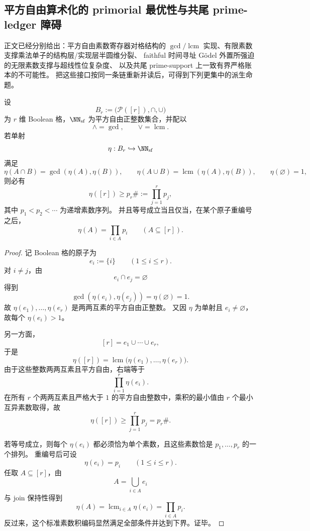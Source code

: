 \subsection{平方自由算术化的 primorial 最优性与共尾 prime-ledger 障碍}

正文已经分别给出：平方自由素数寄存器对格结构的
\(\gcd/\operatorname{lcm}\) 实现、有限素数支撑乘法单子的结构层/实现层半圆维分裂、
faithful 时间寻址 Gödel 外置所强迫的无限素数支撑与超线性位复杂度、
以及共尾 prime-support 上一致有界严格账本的不可能性。
把这些接口按同一条链重新并读后，可得到下列更集中的派生命题。

\begin{theorem}\label{thm:derived-boolean-squarefree-primorial-optimum}
设
\[
B_r:=\bigl(\mathcal P([r]),\cap,\cup\bigr)
\]
为 \(r\) 维 Boolean 格，\(\NN_{\mathrm{sf}}\) 为平方自由正整数集合，并配以
\[
\wedge=\gcd,
\qquad
\vee=\operatorname{lcm}.
\]
若单射
\[
\eta:B_r\hookrightarrow \NN_{\mathrm{sf}}
\]
满足
\[
\eta(A\cap B)=\gcd(\eta(A),\eta(B)),
\qquad
\eta(A\cup B)=\operatorname{lcm}(\eta(A),\eta(B)),
\qquad
\eta(\varnothing)=1,
\]
则必有
\[
\boxed{\;
\eta([r])\ge p_r\#:=\prod_{j=1}^{r}p_j,\;}
\]
其中 \(p_1<p_2<\cdots\) 为递增素数序列。
并且等号成立当且仅当，在某个原子重编号之后，
\[
\boxed{\;
\eta(A)=\prod_{i\in A}p_i
\qquad (A\subseteq [r]).\;}
\]
\end{theorem}

\begin{proof}
记 Boolean 格的原子为
\[
e_i:=\{i\}
\qquad (1\le i\le r).
\]
对 \(i\neq j\)，由
\[
e_i\cap e_j=\varnothing
\]
得到
\[
\gcd(\eta(e_i),\eta(e_j))
=
\eta(\varnothing)
=1.
\]
故 \(\eta(e_1),\dots,\eta(e_r)\) 是两两互素的平方自由正整数。
又因 \(\eta\) 为单射且 \(e_i\neq \varnothing\)，故每个 \(\eta(e_i)>1\)。

另一方面，
\[
[r]=e_1\cup\cdots\cup e_r,
\]
于是
\[
\eta([r])
=
\operatorname{lcm}\bigl(\eta(e_1),\dots,\eta(e_r)\bigr).
\]
由于这些整数两两互素且平方自由，右端等于
\[
\prod_{i=1}^{r}\eta(e_i).
\]
在所有 \(r\) 个两两互素且严格大于 \(1\) 的平方自由整数中，乘积的最小值由 \(r\) 个最小互异素数取得，故
\[
\eta([r])\ge \prod_{j=1}^{r}p_j=p_r\#.
\]

若等号成立，则每个 \(\eta(e_i)\) 都必须恰为单个素数，且这些素数恰是 \(p_1,\dots,p_r\) 的一个排列。
重编号后可设
\[
\eta(e_i)=p_i
\qquad (1\le i\le r).
\]
任取 \(A\subseteq [r]\)，由
\[
A=\bigcup_{i\in A}e_i
\]
与 join 保持性得到
\[
\eta(A)=\operatorname{lcm}_{i\in A}\eta(e_i)=\prod_{i\in A}p_i.
\]
反过来，这个标准素数积编码显然满足全部条件并达到下界。证毕。
\end{proof}

